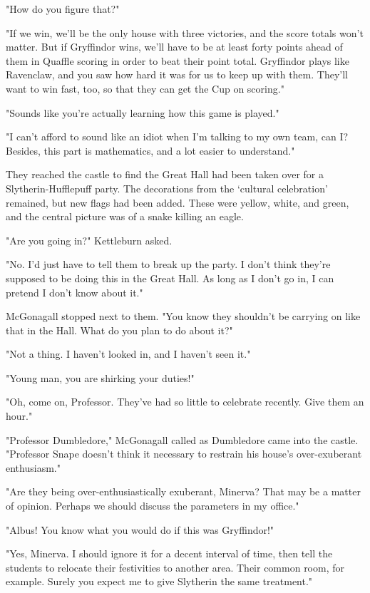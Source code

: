 "How do you figure that?"

"If we win, we'll be the only house with three victories, and the score totals won't matter. But if Gryffindor wins, we'll have to be at least forty points ahead of them in Quaffle scoring in order to beat their point total. Gryffindor plays like Ravenclaw, and you saw how hard it was for us to keep up with them. They'll want to win fast, too, so that they can get the Cup on scoring."

"Sounds like you're actually learning how this game is played."

"I can't afford to sound like an idiot when I'm talking to my own team, can I? Besides, this part is mathematics, and a lot easier to understand."

They reached the castle to find the Great Hall had been taken over for a Slytherin-Hufflepuff party. The decorations from the `cultural celebration' remained, but new flags had been added. These were yellow, white, and green, and the central picture was of a snake killing an eagle.

"Are you going in?" Kettleburn asked.

"No. I'd just have to tell them to break up the party. I don't think they're supposed to be doing this in the Great Hall. As long as I don't go in, I can pretend I don't know about it."

McGonagall stopped next to them. "You know they shouldn't be carrying on like that in the Hall. What do you plan to do about it?"

"Not a thing. I haven't looked in, and I haven't seen it."

"Young man, you are shirking your duties!"

"Oh, come on, Professor. They've had so little to celebrate recently. Give them an hour."

"Professor Dumbledore," McGonagall called as Dumbledore came into the castle. "Professor Snape doesn't think it necessary to restrain his house's over-exuberant enthusiasm."

"Are they being over-enthusiastically exuberant, Minerva? That may be a matter of opinion. Perhaps we should discuss the parameters in my office."

"Albus! You know what you would do if this was Gryffindor!"

"Yes, Minerva. I should ignore it for a decent interval of time, then tell the students to relocate their festivities to another area. Their common room, for example. Surely you expect me to give Slytherin the same treatment."


